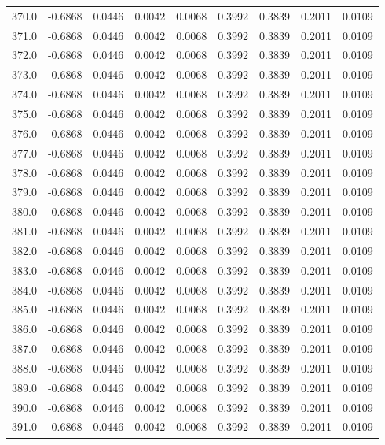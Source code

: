 \begin{longtable}{lrrrrrrrr}
370.0 & -0.6868 & 0.0446 & 0.0042 & 0.0068 & 0.3992 & 0.3839 & 0.2011 & 0.0109 \\
371.0 & -0.6868 & 0.0446 & 0.0042 & 0.0068 & 0.3992 & 0.3839 & 0.2011 & 0.0109 \\
372.0 & -0.6868 & 0.0446 & 0.0042 & 0.0068 & 0.3992 & 0.3839 & 0.2011 & 0.0109 \\
373.0 & -0.6868 & 0.0446 & 0.0042 & 0.0068 & 0.3992 & 0.3839 & 0.2011 & 0.0109 \\
374.0 & -0.6868 & 0.0446 & 0.0042 & 0.0068 & 0.3992 & 0.3839 & 0.2011 & 0.0109 \\
375.0 & -0.6868 & 0.0446 & 0.0042 & 0.0068 & 0.3992 & 0.3839 & 0.2011 & 0.0109 \\
376.0 & -0.6868 & 0.0446 & 0.0042 & 0.0068 & 0.3992 & 0.3839 & 0.2011 & 0.0109 \\
377.0 & -0.6868 & 0.0446 & 0.0042 & 0.0068 & 0.3992 & 0.3839 & 0.2011 & 0.0109 \\
378.0 & -0.6868 & 0.0446 & 0.0042 & 0.0068 & 0.3992 & 0.3839 & 0.2011 & 0.0109 \\
379.0 & -0.6868 & 0.0446 & 0.0042 & 0.0068 & 0.3992 & 0.3839 & 0.2011 & 0.0109 \\
380.0 & -0.6868 & 0.0446 & 0.0042 & 0.0068 & 0.3992 & 0.3839 & 0.2011 & 0.0109 \\
381.0 & -0.6868 & 0.0446 & 0.0042 & 0.0068 & 0.3992 & 0.3839 & 0.2011 & 0.0109 \\
382.0 & -0.6868 & 0.0446 & 0.0042 & 0.0068 & 0.3992 & 0.3839 & 0.2011 & 0.0109 \\
383.0 & -0.6868 & 0.0446 & 0.0042 & 0.0068 & 0.3992 & 0.3839 & 0.2011 & 0.0109 \\
384.0 & -0.6868 & 0.0446 & 0.0042 & 0.0068 & 0.3992 & 0.3839 & 0.2011 & 0.0109 \\
385.0 & -0.6868 & 0.0446 & 0.0042 & 0.0068 & 0.3992 & 0.3839 & 0.2011 & 0.0109 \\
386.0 & -0.6868 & 0.0446 & 0.0042 & 0.0068 & 0.3992 & 0.3839 & 0.2011 & 0.0109 \\
387.0 & -0.6868 & 0.0446 & 0.0042 & 0.0068 & 0.3992 & 0.3839 & 0.2011 & 0.0109 \\
388.0 & -0.6868 & 0.0446 & 0.0042 & 0.0068 & 0.3992 & 0.3839 & 0.2011 & 0.0109 \\
389.0 & -0.6868 & 0.0446 & 0.0042 & 0.0068 & 0.3992 & 0.3839 & 0.2011 & 0.0109 \\
390.0 & -0.6868 & 0.0446 & 0.0042 & 0.0068 & 0.3992 & 0.3839 & 0.2011 & 0.0109 \\
391.0 & -0.6868 & 0.0446 & 0.0042 & 0.0068 & 0.3992 & 0.3839 & 0.2011 & 0.0109 \\

\end{longtable}
